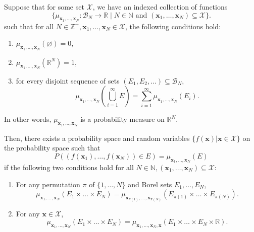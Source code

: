 \begin{theorem}\label{thm:kol-ext}
    Suppose that for some set $\mathcal{X}$, we have an indexed collection of functions
    \begin{equation*}
        \{ \mu_{\mathbf{x}_1, \dots, \mathbf{x}_N} : \mathcal{B}_{N} \to \mathbb{R} \;|\; N \in \mathbb{N} \text{ and } (\mathbf{x}_1, \dots, \mathbf{x}_N) \subseteq \mathcal{X}\}.
    \end{equation*}
    such that for all $N \in \mathbb{Z}^{+}, \mathbf{x}_1, \dots, \mathbf{x}_N \in \mathcal{X}$,
    the following conditions hold:
    \begin{enumerate}
        \item $\mu_{\mathbf{x}_1, \dots, \mathbf{x}_N}( \varnothing) = 0$,
        \item $\mu_{\mathbf{x}_1, \dots, \mathbf{x}_N}(\mathbb{R}^{N}) = 1$,
        \item for every disjoint sequence of sets $(E_1, E_2, \dots) \subseteq \mathcal{B}_N$,
            \begin{equation*}
                \mu_{\mathbf{x}_1, \dots, \mathbf{x}_N}\left(\bigcup_{i = 1}^{\infty}
                E\right) = \sum_{i = 1}^{\infty}\mu_{\mathbf{x}_1, \dots, \mathbf{x}_N}(E_i).
            \end{equation*}
    \end{enumerate}
    In other words, $\mu_{\mathbf{x}_1, \dots, \mathbf{x}_N}$ is a probability measure on $\mathbb{R}^{N}$.

    Then, there exists a probability space and random variables $\{ f(\mathbf{x}) | \mathbf{x} \in \mathcal{X} \}$ 
    on the probability space such that
    \begin{equation*}
        P((f(\mathbf{x}_1), \dots, f(\mathbf{x}_N)) \in E) = \mu_{\mathbf{x}_1, \dots, \mathbf{x}_N}(E)
    \end{equation*}
    if the following two conditions hold for all $N \in \mathbb{N}, (\mathbf{x}_1, \dots, \mathbf{x}_N) \subseteq \mathcal{X}$:
    \begin{enumerate}
        \item For any permutation $\pi$ of $\{ 1, \dots, N \}$ and Borel sets $E_1, \dots, E_N$,
            \begin{equation*}
                \mu_{\mathbf{x}_1, \dots, \mathbf{x}_N}(E_1 \times \dots \times E_N)
                =\mu_{\mathbf{x}_{\pi(1)}, \dots, \mathbf{x}_{\pi(N)}}\left(E_{\pi(1)} \times \dots \times E_{\pi(N)}\right).
            \end{equation*}
        \item For any $\mathbf{x} \in \mathcal{X}$,
            \begin{equation*}
                \mu_{\mathbf{x}_1, \dots, \mathbf{x}_N}(E_1 \times \dots \times E_N)
                =
                \mu_{\mathbf{x}_1, \dots, \mathbf{x}_N, \mathbf{x}}(E_1 \times \dots \times E_N \times \mathbb{R}).
            \end{equation*}
    \end{enumerate}
\end{theorem}
